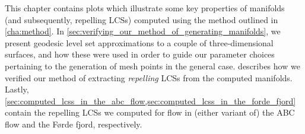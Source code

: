 This chapter contains plots which illustrate some key properties of manifolds
(and subsequently, repelling LCSs) computed using the method outlined in
\cref{cha:method}. In \cref{sec:verifying_our_method_of_generating_manifolds},
we present geodesic level set approximations to a couple of three-dimensional
surfaces, and how these were used in order to guide our parameter choices
pertaining to the generation of mesh points in the general case.
 describes how we verified our method of extracting \emph{repelling}
LCSs from the computed manifolds. Lastly,
\cref{sec:computed_lcss_in_the_abc_flow,sec:computed_lcss_in_the_forde_fjord}
contain the repelling LCSs we computed for flow in (either variant of) the ABC
flow and the Førde fjord, respectively.

